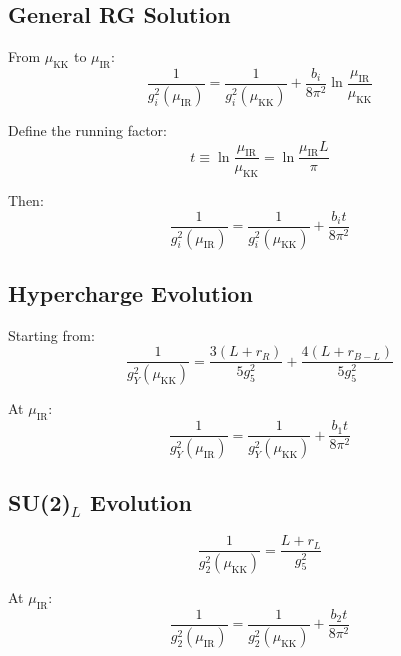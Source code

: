 \documentclass[11pt,a4paper]{article}
\begin{document}
\subsection{General RG Solution}
\label{subsec:rg-solution}

From $\mu_{\text{KK}}$ to $\mu_{\text{IR}}$:
\begin{equation}
\label{eq:rg-general}
\frac{1}{g_i^2(\mu_{\text{IR}})} = \frac{1}{g_i^2(\mu_{\text{KK}})} + \frac{b_i}{8\pi^2}\ln\frac{\mu_{\text{IR}}}{\mu_{\text{KK}}}
\end{equation}

Define the running factor:
\begin{equation}
\label{eq:running-factor}
t \equiv \ln\frac{\mu_{\text{IR}}}{\mu_{\text{KK}}} = \ln\frac{\mu_{\text{IR}} L}{\pi}
\end{equation}

Then:
\begin{equation}
\label{eq:inverse-coupling-ir}
\frac{1}{g_i^2(\mu_{\text{IR}})} = \frac{1}{g_i^2(\mu_{\text{KK}})} + \frac{b_i t}{8\pi^2}
\end{equation}

\subsection{Hypercharge Evolution}
\label{subsec:gy-evolution}

Starting from:
\begin{equation}
\label{eq:gy-kk}
\frac{1}{g_Y^2(\mu_{\text{KK}})} = \frac{3(L+r_R)}{5 g_5^2} + \frac{4(L+r_{B-L})}{5 g_5^2}
\end{equation}

At $\mu_{\text{IR}}$:
\begin{equation}
\label{eq:gy-ir}
\frac{1}{g_Y^2(\mu_{\text{IR}})} = \frac{1}{g_Y^2(\mu_{\text{KK}})} + \frac{b_1 t}{8\pi^2}
\end{equation}

\subsection{SU(2)$_L$ Evolution}
\label{subsec:g2-evolution}

\begin{equation}
\label{eq:g2-kk}
\frac{1}{g_2^2(\mu_{\text{KK}})} = \frac{L + r_L}{g_5^2}
\end{equation}

At $\mu_{\text{IR}}$:
\begin{equation}
\label{eq:g2-ir}
\frac{1}{g_2^2(\mu_{\text{IR}})} = \frac{1}{g_2^2(\mu_{\text{KK}})} + \frac{b_2 t}{8\pi^2}
\end{equation}
\end{document}
